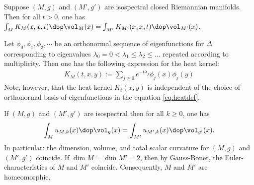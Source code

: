\begin{proposition}
  Suppose $(M,g)$ and $(M',g')$ are isospectral closed Riemannian manifolds.  Then for all $t>0$, one has $\int_M K_M(x,x,t) \dop \vol_M(x) = \int_{M'} K_{M'}(x,x,t)\dop \vol_{M'}(x)$.
\end{proposition}
Let $\phi_0,\phi_1,\phi_2,\cdots$ be an orthonormal sequence of eigenfunctions for $\Delta$ corresponding to eigenvalues $\lambda_0=0 <\lambda_1 \leq \lambda_2 \leq \dots$ repeated according to multiplicity.  Then one has the following expression for the heat kernel:
\begin{align}\label{eq:heatdef}
  K_M(t,x,y):= \sum_{j\geq 0} e^{-t\lambda_j} \phi_j(x)\phi_j(y)
\end{align}
Note, however, that the heat kernel $K_t(x,y)$ is independent of the choice of orthonormal basis of eigenfunctions in the equation \ref{eq:heatdef}.
\begin{corollary}
  If $(M,g)$ and $(M',g')$ are isospectral then for all $k\geq 0$, one has
  \begin{align}
    \int_M u_{M,k}(x) \dop \vol_g(x)  = \int_{M'} u_{M',k}(x) \dop \vol_{g'}(x).
  \end{align}
  In particular: the dimension, volume, and total scalar curvature for $(M,g)$ and $(M',g')$ coincide. If $\dim M = \dim M' = 2$, then by Gauss-Bonet, the Euler-characteristics of $M$ and $M'$ coincide.  Consequently, $M$ and $M'$ are homeomorphic.
\end{corollary}

